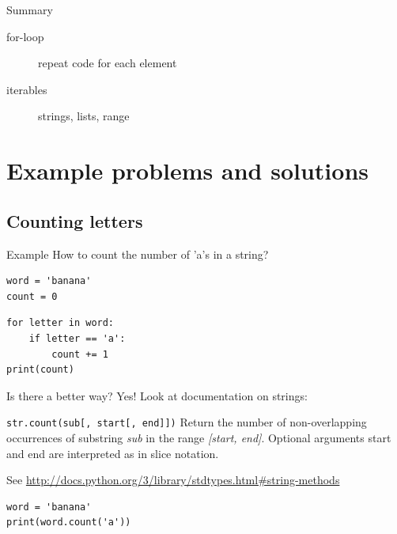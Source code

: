\documentclass[aspectratio=169,usenames,dvipsnames]{beamer}
\begin{document}
\begin{frame}{Summary}
    \begin{description}
        \item[for-loop] repeat code for each element
        \item[iterables] strings, lists, range
    \end{description}
\end{frame}

\section{Example problems and solutions}
\subsection{Counting letters}
\begin{frame}[fragile]{Example}
How to count the number of 'a's in a string?
\begin{lstlisting}
word = 'banana'
count = 0
\end{lstlisting}
\pause
\begin{lstlisting}
for letter in word:
    if letter == 'a':
        count += 1
print(count)
\end{lstlisting}
\end{frame}

\begin{frame}[fragile]{Is there a better way?}
Yes! Look at documentation on strings:

\begin{block}{\texttt{str.count(sub[, start[, end]])}}
    Return the number of non-overlapping occurrences of substring \emph{sub}
    in the range \emph{[start, end]}.
    Optional arguments start and end are interpreted as in slice notation.
\end{block}

See \url{http://docs.python.org/3/library/stdtypes.html#string-methods}

\pause
\begin{lstlisting}
word = 'banana'
print(word.count('a'))
\end{lstlisting}
\end{frame}
\end{document}

